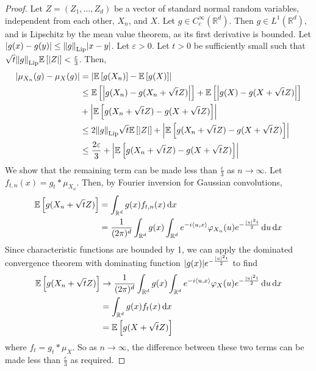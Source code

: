 \begin{proof}
	Let \( Z = (Z_1, \dots, Z_d) \) be a vector of standard normal random variables, independent from each other, \( X_n \), and \( X \).
	Let \( g \in C_c^\infty(\mathbb R^d) \).
	Then \( g \in L^1(\mathbb R^d) \), and is Lipschitz by the mean value theorem, as its first derivative is bounded.
	Let \( \abs{g(x) - g(y)} \leq \norm{g}_{\mathrm{Lip}} \abs{x - y} \).
	Let \( \varepsilon > 0 \).
	Let \( t > 0 \) be sufficiently small such that \( \sqrt t \norm{g}_{\mathrm{Lip}} \mathbb{E}\left[{\abs{Z}}\right] < \frac{\varepsilon}{3} \).
	Then,
	\begin{align*}
		\abs{\mu_{X_n}(g) - \mu_X(g)} &= \abs{\mathbb{E}\left[{g(X_n)}\right] - \mathbb{E}\left[{g(X)}\right]} \\
		&\leq \mathbb{E}\left[{\abs{g(X_n) - g(X_n + \sqrt t Z)}}\right] + \mathbb{E}\left[{\abs{g(X) - g(X + \sqrt t Z)}}\right] \\
		&+ \abs{\mathbb{E}\left[{g(X_n + \sqrt t Z) - g(X + \sqrt t Z)}\right]} \\
		&\leq 2\norm{g}_{\mathrm{Lip}}\sqrt t \mathbb{E}\left[{\abs{Z}}\right] + \abs{\mathbb{E}\left[{g(X_n + \sqrt t Z) - g(X + \sqrt t Z)}\right]} \\
		&\leq \frac{2\varepsilon}{3} + \abs{\mathbb{E}\left[{g(X_n + \sqrt t Z) - g(X + \sqrt t Z)}\right]}
	\end{align*}
	We show that the remaining term can be made less than \( \frac{\varepsilon}{3} \) as \( n \to \infty \).
	Let \( f_{t,n}(x) = g_t \ast \mu_{X_n} \).
	Then, by Fourier inversion for Gaussian convolutions,
	\begin{align*}
		\mathbb{E}\left[{g(X_n + \sqrt t Z)}\right] &= \int_{\mathbb R^d} g(x) f_{t,n}(x) \dd{x} \\
		&= \frac{1}{(2\pi)^d} \int_{\mathbb R^d} g(x) \int_{\mathbb R^d} e^{-i\left\langle{u,x}\right\rangle} \varphi_{X_n}(u) e^{-\frac{\abs{u}^2 t}{2}} \dd{u} \dd{x}
	\end{align*}
	Since characteristic functions are bounded by 1, we can apply the dominated convergence theorem with dominating function \( \abs{g(x)} e^{-\frac{\abs{u}^2 t}{2}} \) to find
	\begin{align*}
		\mathbb{E}\left[{g(X_n + \sqrt t Z)}\right] &\to \frac{1}{(2\pi)^d} \int_{\mathbb R^d} g(x) \int_{\mathbb R^d} e^{-i\left\langle{u,x}\right\rangle} \varphi_X(u) e^{-\frac{\abs{u}^2 t}{2}} \dd{u} \dd{x} \\
		&= \int_{\mathbb R^d} g(x) f_t(x) \dd{x} \\
		&= \mathbb{E}\left[{g(X + \sqrt t Z)}\right]
	\end{align*}
	where \( f_t = g_t \ast \mu_X \).
	So as \( n \to \infty \), the difference between these two terms can be made less than \( \frac{\varepsilon}{3} \) as required.
\end{proof}
